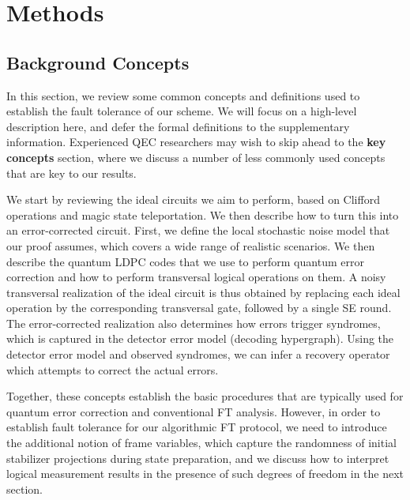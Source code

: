 
\setcounter{figure}{0}
\renewcommand{\figurename}{Extended Data Fig.}

\section{Methods}
\subsection{Background Concepts}

In this section, we review some common concepts and definitions used to establish the fault tolerance of our scheme.
%
We will focus on a high-level description here, and defer the formal definitions to the supplementary information.
%
Experienced QEC researchers may wish to skip ahead to the \textbf{key concepts} section, where we discuss a number of less commonly used concepts that are key to our results.

We start by reviewing the ideal circuits we aim to perform, based on Clifford operations and magic state teleportation.
%
We then describe how to turn this into an error-corrected circuit.
%
First, we define the local stochastic noise model that our proof assumes, which covers a wide range of realistic scenarios.
%
We then describe the quantum LDPC codes that we use to perform quantum error correction and how to perform transversal logical operations on them.
%
A noisy transversal realization of the ideal circuit is thus obtained by replacing each ideal operation by the corresponding transversal gate, followed by a single SE round.
%
The error-corrected realization also determines how errors trigger syndromes, which is captured in the detector error model (decoding hypergraph).
%
Using the detector error model and observed syndromes, we can infer a recovery operator which attempts to correct the actual errors.

Together, these concepts establish the basic procedures that are typically used for quantum error correction and conventional FT analysis.
%
However, in order to establish fault tolerance for our algorithmic FT protocol, we need to introduce the additional notion of frame variables, which capture the randomness of initial stabilizer projections during state preparation, and we discuss how to interpret logical measurement results in the presence of such degrees of freedom in the next section.

